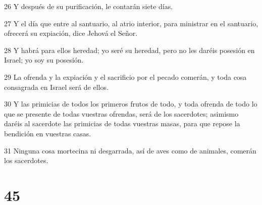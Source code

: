 \par 26 Y después de su purificación, le contarán siete días.
\par 27 Y el día que entre al santuario, al atrio interior, para ministrar en el santuario, ofrecerá su expiación, dice Jehová el Señor.
\par 28 Y habrá para ellos heredad; yo seré su heredad, pero no les daréis posesión en Israel; yo soy su posesión.
\par 29 La ofrenda y la expiación y el sacrificio por el pecado comerán, y toda cosa consagrada en Israel será de ellos.
\par 30 Y las primicias de todos los primeros frutos de todo, y toda ofrenda de todo lo que se presente de todas vuestras ofrendas, será de los sacerdotes; asimismo daréis al sacerdote las primicias de todas vuestras masas, para que repose la bendición en vuestras casas. 
\par 31 Ninguna cosa mortecina ni desgarrada, así de aves como de animales, comerán los sacerdotes. 

\chapter{45}

